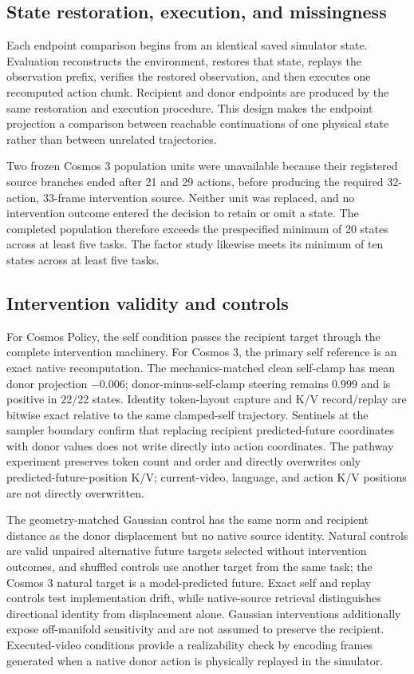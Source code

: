 \documentclass{article}
\begin{document}
\subsection{State restoration, execution, and missingness}

Each endpoint comparison begins from an identical saved simulator state. Evaluation reconstructs the environment, restores that state, replays the observation prefix, verifies the restored observation, and then executes one recomputed action chunk. Recipient and donor endpoints are produced by the same restoration and execution procedure. This design makes the endpoint projection a comparison between reachable continuations of one physical state rather than between unrelated trajectories.

Two frozen Cosmos 3 population units were unavailable because their registered source branches ended after 21 and 29 actions, before producing the required 32-action, 33-frame intervention source. Neither unit was replaced, and no intervention outcome entered the decision to retain or omit a state. The completed population therefore exceeds the prespecified minimum of 20 states across at least five tasks. The factor study likewise meets its minimum of ten states across at least five tasks.

\subsection{Intervention validity and controls}
\label{app:controls}

For Cosmos Policy, the self condition passes the recipient target through the complete intervention machinery. For Cosmos 3, the primary self reference is an exact native recomputation. The mechanics-matched clean self-clamp has mean donor projection $-0.006$; donor-minus-self-clamp steering remains $0.999$ and is positive in 22/22 states. Identity token-layout capture and K/V record/replay are bitwise exact relative to the same clamped-self trajectory. Sentinels at the sampler boundary confirm that replacing recipient predicted-future coordinates with donor values does not write directly into action coordinates. The pathway experiment preserves token count and order and directly overwrites only predicted-future-position K/V; current-video, language, and action K/V positions are not directly overwritten.

The geometry-matched Gaussian control has the same norm and recipient distance as the donor displacement but no native source identity. Natural controls are valid unpaired alternative future targets selected without intervention outcomes, and shuffled controls use another target from the same task; the Cosmos 3 natural target is a model-predicted future. Exact self and replay controls test implementation drift, while native-source retrieval distinguishes directional identity from displacement alone. Gaussian interventions additionally expose off-manifold sensitivity and are not assumed to preserve the recipient. Executed-video conditions provide a realizability check by encoding frames generated when a native donor action is physically replayed in the simulator.
\end{document}
